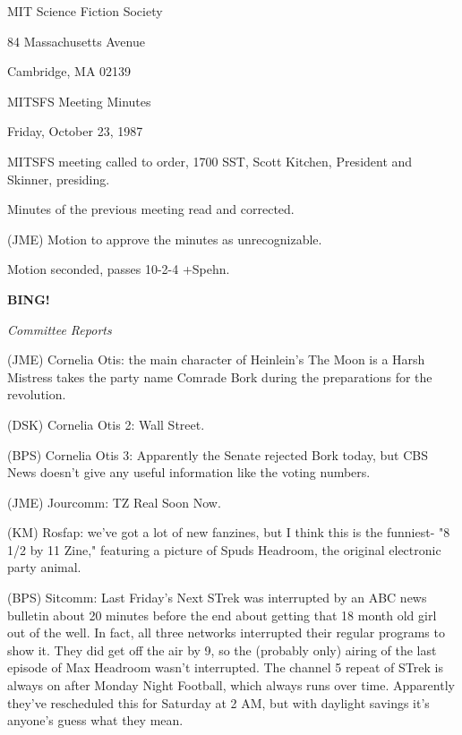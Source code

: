 \documentclass[12pt]{article}
\newcommand{\bing}{{\bf BING!} }
\newcommand{\goto}[1]{\bing \vskip 12pt \centerline{{\em{#1}}}}
\begin{document}
\begin{center}

MIT Science Fiction Society 

84 Massachusetts Avenue

Cambridge, MA 02139

\vspace{12pt}

MITSFS Meeting Minutes 

Friday, October 23, 1987

\end{center}
 
\vspace{18pt}

\setlength{\parskip}{6pt}

\noindent
MITSFS meeting called to order, 1700 SST,
Scott Kitchen, President and Skinner, presiding.

Minutes of the previous meeting read and corrected.

(JME) Motion to approve the minutes as unrecognizable.

Motion seconded, passes 10-2-4 +Spehn.

\goto{Committee Reports}

(JME) Cornelia Otis: the main character of Heinlein's The Moon is a Harsh Mistress takes the party name Comrade Bork during the preparations for the revolution.

(DSK) Cornelia Otis 2: Wall Street.

(BPS) Cornelia Otis 3: Apparently the Senate rejected Bork today, but CBS News doesn't give any useful information like the voting numbers.

(JME) Jourcomm: TZ Real Soon Now.

(KM) Rosfap: we've got a lot of new fanzines, but I think this is the funniest- "8 1/2 by 11 Zine," featuring a picture of Spuds Headroom, the original electronic party animal.

(BPS) Sitcomm: Last Friday's Next STrek was interrupted by an ABC news bulletin about 20 minutes before the end about getting that 18 month old girl out of the well. In fact, all three networks interrupted their regular programs to show it. They did get off the air by 9, so the (probably only) airing of the last episode of Max Headroom wasn't interrupted. The channel 5 repeat of STrek is always on after Monday Night Football, which always runs over time. Apparently they've rescheduled this for Saturday at 2 AM, but with daylight savings it's anyone's guess what they mean.
\end{document}
